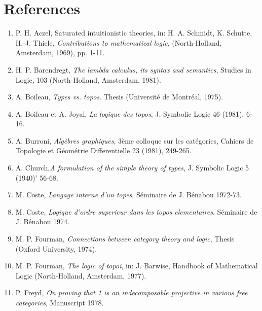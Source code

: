 \section*{References} 

\def\bb#1{\bibitem[#1]{#1}}

\begin{enumerate}[leftmargin=*, widest=8888, align=left]

\item[] P. H. Aczel, Saturated intuitionistic theories, in: H. A. Schmidt, K. Schutte,
H.-J. Thiele, {\em Contributions to mathematical logic}, (North-Holland,
Amsterdam, 1969), pp. 1-11.

\item[] H. P. Barendregt, {\em The lambda calculus, its syntax and semantics}, Studies in
Logic, 103 (North-Holland, Amsterdam, 1981).

\item[] A. Boileau, {\em Types vs. topos}. Thesis (Universit\'e de Montr\'eal, 1975).

\item[] A. Boileau et A. Joyal, {\em La logique des topos}, J. Symbolic Logic 46 (1981),
6-16.

\item[] A. Burroni, {\em Alg\`ebres graphiques}, 3\`eme colloque sur les cat\'egories, Cahiers de
Topologie et G\'eom\'etrie Differentielle 23 (1981), 249-265.

\item[] A. Church,{\em A formulation of the simple theory of types}, J. Symbolic Logic 5
(1940)' 56-68.

\item[] M. Coste, {\em Langage interne d'un topes}, S\'eminaire de J. B\'enabou 1972-73.

\item[] M. Coste, {\em Logique d'ordre superieur dans les topos elementaires}. S\'eminaire
de J. B\'enabou 1974.

\item[]M. P. Fourman, {\em Connections between category theory and logic}, Thesis
(Oxford University, 1974).

\item[]M. P. Fourman, {\em The logic of topoi}, in: J. Barwise, Handbook of Mathematical
Logic (North-Holland, Amsterdam, 1977).

\item[] P. Freyd, {\em On proving that 1 is an indecomposable projective in various free
categories}, Manuscript 1978.


\end{enumerate}
